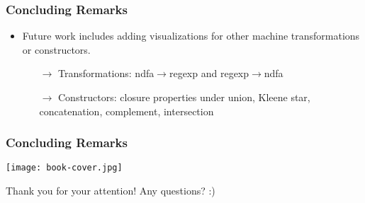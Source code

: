 \documentclass{beamer}
\newcommand{\arrow}{\(\rightarrow\)}
\begin{document}
\begin{frame}[fragile]
\frametitle{Concluding Remarks}
\begin{scriptsize}
\begin{itemize}
\item<1-> Future work includes adding visualizations for other machine transformations or constructors. \newline
\begin{itemize}
\scriptsize
\item[\arrow] Transformations: ndfa\arrow regexp and regexp\arrow ndfa \newline
\item[\arrow] Constructors: closure properties under union, Kleene star, concatenation, complement, intersection
\end{itemize}


\end{itemize}
\end{scriptsize}
\end{frame}

\begin{frame}[fragile]
\frametitle{Concluding Remarks}
\begin{scriptsize}
\large
\begin{center}
\texttt{[image: book-cover.jpg]}
\end{center}

\begin{center}
Thank you for your attention! Any questions? :) \newline
\end{center}


\end{scriptsize}
\end{frame}
\end{document}

